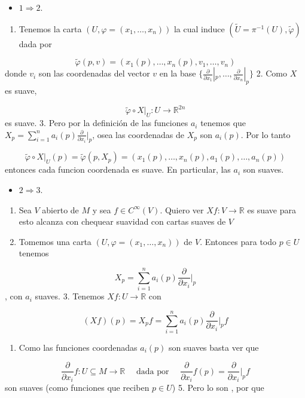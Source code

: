 \begin{bookproof}{}
\begin{itemize}
\item $1 \Rightarrow 2$.
\end{itemize}
\begin{enumerate}
\item Tenemos la carta $(U,\varphi=(x_{1},\ldots,x_{n}))$ la cual induce $(\widetilde{U}=\pi ^{-1}(U),\widetilde{\varphi})$ dada por
\end{enumerate}
\[
\widetilde\varphi(p,v)=(x_1(p),\ldots,x_n(p),v_1,\ldots,v_n)
\]
donde $v_i$ son las coordenadas del vector $v$ en la base $\{ \frac{\partial}{\partial x_{1}}|_{p},\ldots,\frac{\partial}{\partial x_{n}}|_{p} \}$ 2. Como $X$ es suave,

\[
\widetilde\varphi \circ X|_U:U \to \mathbb R^{2n}
\]
es suave. 3. Pero por la definición de las funciones $a_i$ tenemos que $X_p=\sum_{i=1}^n a_i(p)\frac{\partial}{\partial x_i}|_p$, osea las coordenadas de $X_p$ son $a_i(p)$. Por lo tanto

\[
\widetilde\varphi \circ X|_U(p)=\widetilde{\varphi}(p,X_{p})=(x_1(p),\ldots,x_n(p),a_1(p),\ldots,a_n(p))
\]
entonces cada funcion coordenada es suave. En particular, las $a_i$ son suaves.

\begin{itemize}
\item $2 \Rightarrow 3$.
\end{itemize}
\begin{enumerate}
\item Sea $V$ abierto de $M$ y sea $f \in C^\infty(V)$. Quiero ver $Xf:V\rightarrow\mathbb{R}$ es suave para esto alcanza con chequear suavidad con cartas suaves de $V$
\item Tomemos una carta $(U,\varphi=(x_1,\ldots,x_n))$ de $V$. Entonces para todo $p\in U$ tenemos
\end{enumerate}
\[
X_p=\sum_{i=1}^n a_i(p)\frac{\partial}{\partial x_i}|_p
\]
, con $a_i$ suaves. 3. Tenemos $Xf:U \to \mathbb R$ con

\[
(Xf)(p)=X_p f=\sum_{i=1}^n a_i(p)\frac{\partial }{\partial x_i}\bigg|_{p}f
\]
\begin{enumerate}[start=4]
\item Como las funciones coordenadas $a_{i}(p)$ son suaves basta ver que
\end{enumerate}
\[
\frac{\partial}{\partial x_{i}} f:U\subseteq M\rightarrow \mathbb{R}\quad\text{ dada por }\quad \frac{\partial}{\partial x_{i}}f(p)=\frac{\partial}{\partial x_{i}}\bigg|_{p}f
\]
son suaves (como funciones que reciben $p\in U$) 5. Pero lo son , por que


\end{bookproof}
